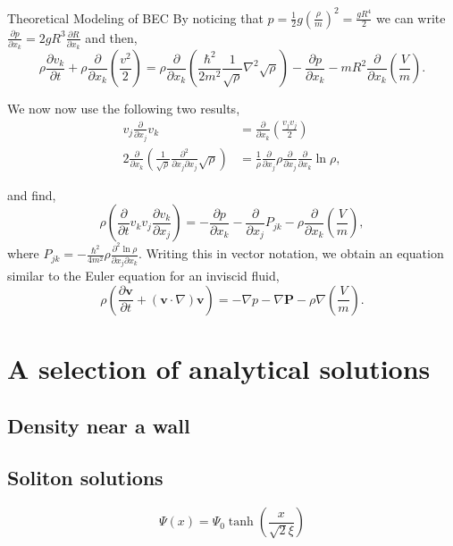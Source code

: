 \begin{chapter}{\label{cha:theoretical_model}Theoretical Modeling of BEC}
	By noticing that $p = \frac{1}{2}g \left ( \frac{\rho}{m} \right ) ^2 = \frac{gR^4}{2}$ we can write $\frac{\partial p}{\partial x_k} = 2gR^3\frac{\partial R}{\partial x_k}$ and then,
	\begin{equation*}
	\rho\frac{\partial v_k}{\partial t} + \rho\frac{\partial}{\partial x_k} \left (\frac{v^2}{2}\right) =\rho \frac{\partial}{\partial x_k}\left(\frac{\hbar^2}{2m^2} \frac{1}{\sqrt{\rho}} \nabla^2\sqrt{\rho} \right) - \frac{\partial p}{\partial x_k} - mR^2\frac{\partial}{\partial x_k}\left ( \frac{V}{m}\right ).
	\end{equation*}

	We now now use the following two results,
	\begin{align*}
	v_j \frac{\partial}{\partial x_j}v_k &= \frac{\partial}{\partial x_k}\left ( \frac{v_jv_j}{2}\right )\\
	2\frac{\partial}{\partial x_k}\left( \frac{1}{\sqrt{\rho}} \frac{\partial^2}{\partial x_j \partial x_j} \sqrt{\rho}\right) &= \frac{1}{\rho} \frac{\partial}{\partial x_j}\rho \frac{\partial}{\partial x_j}\frac{\partial}{\partial x_k} \ln{\rho},
	\end{align*}

	and find,
	\begin{equation*}
	\rho\left ( \frac{\partial}{\partial t} v_k v_j\frac{\partial v_k}{\partial x_j}\right) = -\frac{\partial p}{\partial x_k} - \frac{\partial}{\partial x_j} P_{jk} - \rho \frac{\partial}{\partial x_k}\left( \frac{V}{m} \right),
	\end{equation*}
	where $P_{jk} = -\frac{\hbar^2}{4m^2}\rho\frac{\partial^2\ln{\rho}}{\partial x_j \partial x_k}$. Writing this in vector notation, we obtain an equation similar to the Euler equation for an inviscid fluid,
	\begin{equation}
	\rho\left( \frac{\partial \mathbf{v}}{\partial t} + \left( \mathbf{v} \cdot \nabla \right)\mathbf{v} \right) = -\nabla p - \nabla \mathbf{P} - \rho \nabla \left(\frac{V}{m}\right).
	\end{equation}

\section{\label{section:solutions} A selection of analytical solutions}
	\subsection{\label{section:wall} Density near a wall}
	\subsection{\label{section:soliton} Soliton solutions}
		\begin{equation}
		\Psi(x) = \Psi_0 \tanh \left( \frac{x}{\sqrt{2}\xi} \right)
		\label{eq:soliton}
		\end{equation}

\end{chapter}
